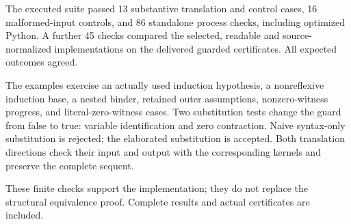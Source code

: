 The executed suite passed 13 substantive translation and control cases, 16 malformed-input controls, and 86 standalone process checks, including optimized Python. A further 45 checks compared the selected, readable and source-normalized implementations on the delivered guarded certificates. All expected outcomes agreed.

The examples exercise an actually used induction hypothesis, a nonreflexive induction base, a nested binder, retained outer assumptions, nonzero-witness progress, and literal-zero-witness cases. Two substitution tests change the guard from false to true: variable identification and zero contraction. Naive syntax-only substitution is rejected; the elaborated substitution is accepted. Both translation directions check their input and output with the corresponding kernels and preserve the complete sequent.

These finite checks support the implementation; they do not replace the structural equivalence proof. Complete results and actual certificates are included.
